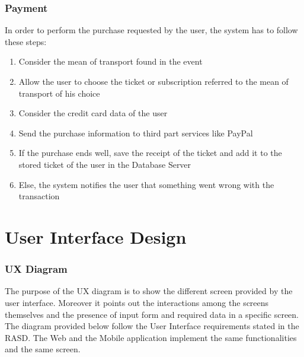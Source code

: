 \documentclass[numbers=noenddot, 12pt, a4paper, oneside]{scrbook}
\begin{document}
\subsection*{Payment}

In order to perform the purchase requested by the user, the system has to follow these steps:

\begin{enumerate}
	\item Consider the mean of transport found in the event
	\item Allow the user to choose the ticket or subscription referred to the mean of transport of his choice
	\item Consider the credit card data of the user
	\item Send the purchase information to third part services like PayPal
	\item If the purchase ends well, save the receipt of the ticket and add it to the stored ticket of the user in the Database Server
	\item Else, the system notifies the user that something went wrong with the transaction
\end{enumerate}


\chapter{User Interface Design}

\subsection*{UX Diagram}

The purpose of the UX diagram is to show the different screen provided by the user interface. Moreover it points out the interactions among the screens themselves and the presence of input form and required data in a specific screen.\\

The diagram provided below follow the User Interface requirements stated in the RASD. The Web and the Mobile application implement the same  functionalities and the same screen.
\end{document}

